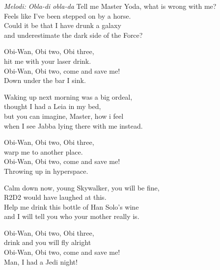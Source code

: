 {\footnotesize\textit{Melodi: Obla-di obla-da}}
Tell me Master Yoda, what is wrong with me?\\
Feels like I've been stepped on by a horse.\\
Could it be that I have drunk a galaxy\\
and underestimate the dark side of the Force?\par
\vspace{10pt}
Obi-Wan, Obi two, Obi three,\\
hit me with your laser drink.\\
Obi-Wan, Obi two, come and save me! \\
Down under the bar I sink.\par
\vspace{10pt}
Waking up next morning was a big ordeal,\\
thought I had a Leia in my bed,\\
but you can imagine, Master, how i feel\\
when I see Jabba lying there with me instead.\par
\vspace{10pt}
Obi-Wan, Obi two, Obi three,\\
warp me to another place.\\
Obi-Wan, Obi two, come and save me!\\
Throwing up in hyperspace.\par
\vspace{10pt}
Calm down now, young Skywalker, you will be fine,\\
R2D2 would have laughed at this.\\
Help me drink this bottle of Han Solo’s wine\\
and I will tell you who your mother really is.\par
\vspace{10pt}
Obi-Wan, Obi two, Obi three,\\
drink and you will fly alright\\
Obi-Wan, Obi two, come and save me!\\
Man, I had a Jedi night!
\par
\vspace{10pt}

